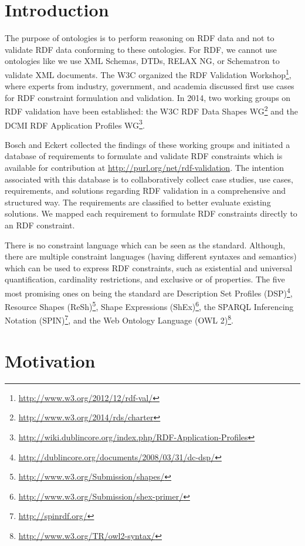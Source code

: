 \documentclass{llncs}
\begin{document}

\section{Introduction}

The purpose of ontologies is to perform reasoning on RDF data and not to validate RDF data conforming to these ontologies.
For RDF, we cannot use ontologies like we use XML Schemas, DTDs, RELAX NG, or Schematron to validate XML documents.
The W3C organized the RDF Validation Workshop\footnote{\url{http://www.w3.org/2012/12/rdf-val/}}, 
where experts from industry, government, and academia discussed first use cases for RDF constraint formulation and validation.
In 2014, two working groups on RDF validation have been established: 
the W3C RDF Data Shapes WG\footnote{\url{http://www.w3.org/2014/rds/charter}} and the DCMI RDF Application Profiles WG\footnote{\url{http://wiki.dublincore.org/index.php/RDF-Application-Profiles}}. 

Bosch and Eckert \cite{BoschEckert2014} collected the findings of these working groups and initiated a database of requirements to formulate and validate RDF constraints
which is available for contribution at \url{http://purl.org/net/rdf-validation}.
The intention associated with this database is to collaboratively collect case studies, use cases, requirements, and solutions regarding RDF validation in a comprehensive and structured way. 
The requirements are classified to better evaluate existing solutions. 
We mapped each requirement to formulate RDF constraints directly to an RDF constraint.

There is no constraint language which can be seen as the standard.
Although, there are multiple constraint languages (having different syntaxes and semantics) which can be used to express RDF constraints, such as existential and universal quantification, cardinality restrictions, and exclusive or of properties.
The five most promising ones on being the standard are
Description Set Profiles (DSP)\footnote{\url{http://dublincore.org/documents/2008/03/31/dc-dsp/}},
Resource Shapes (ReSh)\footnote{\url{http://www.w3.org/Submission/shapes/}}, 
Shape Expressions (ShEx)\footnote{\url{http://www.w3.org/Submission/shex-primer/}},
the SPARQL Inferencing Notation (SPIN)\footnote{\url{http://spinrdf.org/}}, 
and the Web Ontology Language (OWL 2)\footnote{\url{http://www.w3.org/TR/owl2-syntax/}}.

\section{Motivation}
\end{document}
